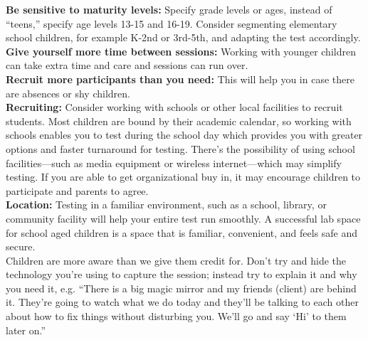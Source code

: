 \textbf{Be sensitive to maturity levels:} Specify grade levels or ages, instead of “teens,” specify age levels 13-15 and 16-19. Consider segmenting elementary school children, for example K-2nd or 3rd-5th, and adapting the test accordingly\cite{testwithkids}.\\

\textbf{Give yourself more time between sessions:} Working with younger children can take extra time and care and sessions can run over.\cite{testwithkids}\\

\textbf{Recruit more participants than you need:} This will help you in case there are absences or shy children\cite{testwithkids}.\\

\textbf{Recruiting:} Consider working with schools or other local facilities to recruit students. Most children are bound by their academic calendar, so working with schools enables you to test during the school day which provides you with greater options and faster turnaround for testing.  There’s the possibility of using school facilities—such as media equipment or wireless internet—which may simplify testing.  If you are able to get organizational buy in, it may encourage children to participate and parents to agree\cite{testwithkids}.\\

\textbf{Location:} Testing in a familiar environment, such as a school, library, or community facility will help your entire test run smoothly. A successful lab space for school aged children is a space that is familiar, convenient, and feels safe and secure\cite{testwithkids}.\\

Children are more aware than we give them credit for. Don’t try and hide the technology you’re using to capture the session; instead try to explain it and why you need it, e.g.
“There is a big magic mirror and my friends (client) are behind it. They’re going to watch what we do today and they’ll be talking to each other about how to fix things without disturbing you. We’ll go and say ‘Hi’ to them later on.”\cite{testwithkids}\\

